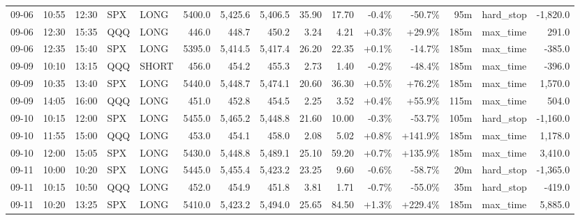 \documentclass[11pt,a4paper,twoside]{article}
\begin{document}
\begin{landscape}
\begin{center}
\begin{longtable}{>{\color{txtmain}}l l l l l r r r r r r r r >{\color{txtmain}}l r}
09-06 & 10:55 & 12:30 & SPX & LONG & 5400.0 & 5,425.6 & 5,406.5 & 35.90 & 17.70 & \textcolor{lossred}{-0.4\%} & \textcolor{lossred}{-50.7\%} & 95m & hard\_stop & \textcolor{lossred}{-1,820.0} \\
09-06 & 12:30 & 15:35 & QQQ & LONG & 446.0 & 448.7 & 450.2 & 3.24 & 4.21 & \textcolor{wingreen}{+0.3\%} & \textcolor{wingreen}{+29.9\%} & 185m & max\_time & \textcolor{wingreen}{291.0} \\
09-06 & 12:35 & 15:40 & SPX & LONG & 5395.0 & 5,414.5 & 5,417.4 & 26.20 & 22.35 & \textcolor{wingreen}{+0.1\%} & \textcolor{lossred}{-14.7\%} & 185m & max\_time & \textcolor{lossred}{-385.0} \\
09-09 & 10:10 & 13:15 & QQQ & SHORT & 456.0 & 454.2 & 455.3 & 2.73 & 1.40 & \textcolor{lossred}{-0.2\%} & \textcolor{lossred}{-48.4\%} & 185m & max\_time & \textcolor{lossred}{-396.0} \\
09-09 & 10:35 & 13:40 & SPX & LONG & 5440.0 & 5,448.7 & 5,474.1 & 20.60 & 36.30 & \textcolor{wingreen}{+0.5\%} & \textcolor{wingreen}{+76.2\%} & 185m & max\_time & \textcolor{wingreen}{1,570.0} \\
09-09 & 14:05 & 16:00 & QQQ & LONG & 451.0 & 452.8 & 454.5 & 2.25 & 3.52 & \textcolor{wingreen}{+0.4\%} & \textcolor{wingreen}{+55.9\%} & 115m & max\_time & \textcolor{wingreen}{504.0} \\
09-10 & 10:15 & 12:00 & SPX & LONG & 5455.0 & 5,465.2 & 5,448.8 & 21.60 & 10.00 & \textcolor{lossred}{-0.3\%} & \textcolor{lossred}{-53.7\%} & 105m & hard\_stop & \textcolor{lossred}{-1,160.0} \\
09-10 & 11:55 & 15:00 & QQQ & LONG & 453.0 & 454.1 & 458.0 & 2.08 & 5.02 & \textcolor{wingreen}{+0.8\%} & \textcolor{wingreen}{+141.9\%} & 185m & max\_time & \textcolor{wingreen}{1,178.0} \\
09-10 & 12:00 & 15:05 & SPX & LONG & 5430.0 & 5,448.8 & 5,489.1 & 25.10 & 59.20 & \textcolor{wingreen}{+0.7\%} & \textcolor{wingreen}{+135.9\%} & 185m & max\_time & \textcolor{wingreen}{3,410.0} \\
09-11 & 10:00 & 10:20 & SPX & LONG & 5445.0 & 5,455.4 & 5,423.2 & 23.25 & 9.60 & \textcolor{lossred}{-0.6\%} & \textcolor{lossred}{-58.7\%} & 20m & hard\_stop & \textcolor{lossred}{-1,365.0} \\
09-11 & 10:15 & 10:50 & QQQ & LONG & 452.0 & 454.9 & 451.8 & 3.81 & 1.71 & \textcolor{lossred}{-0.7\%} & \textcolor{lossred}{-55.0\%} & 35m & hard\_stop & \textcolor{lossred}{-419.0} \\
09-11 & 10:20 & 13:25 & SPX & LONG & 5410.0 & 5,423.2 & 5,494.0 & 25.65 & 84.50 & \textcolor{wingreen}{+1.3\%} & \textcolor{wingreen}{+229.4\%} & 185m & max\_time & \textcolor{wingreen}{5,885.0} \\

\end{longtable}
\end{center}
\end{landscape}
\end{document}

